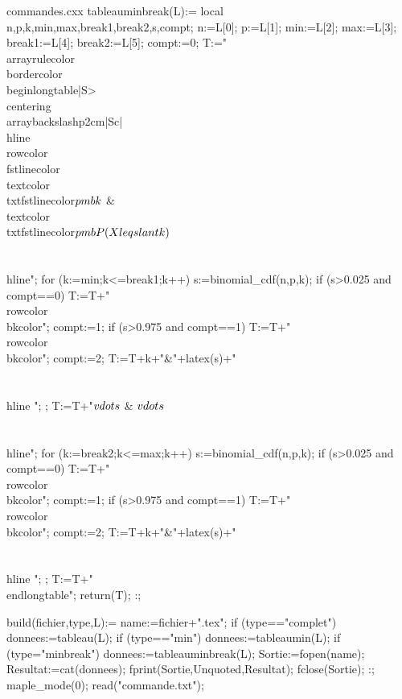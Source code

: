 \begin{VerbatimOut}{commandes.cxx}
tableauminbreak(L):={
 local n,p,k,min,max,break1,break2,s,compt;
 n:=L[0];
 p:=L[1];
 min:=L[2];
 max:=L[3];
 break1:=L[4];
 break2:=L[5];
 compt:=0;
 T:="\\arrayrulecolor{\\bordercolor}\\begin{longtable}{|S{>{\\centering\\arraybackslash}p{2cm}}|Sc|} \\hline\\rowcolor{\\fstlinecolor}\\textcolor{\\txtfstlinecolor}{$\\pmb{k}$} & \\textcolor{\\txtfstlinecolor}{$\\pmb{P(X\\leqslant k)}$} \\\\ \\hline";
 for (k:=min;k<=break1;k++)
 {
         s:=binomial_cdf(n,p,k);
         if (s>0.025 and compt==0) { T:=T+"\\rowcolor{\\bkcolor}"; compt:=1;}
         if (s>0.975 and compt==1) { T:=T+"\\rowcolor{\\bkcolor}"; compt:=2;}                T:=T+k+"&"+latex(s)+"\\\\ \\hline ";
 };
 T:=T+"$\\vdots$ & $\\vdots$\\\\ \\hline";
 for (k:=break2;k<=max;k++)
 {
         s:=binomial_cdf(n,p,k);
         if (s>0.025 and compt==0) { T:=T+"\\rowcolor{\\bkcolor}"; compt:=1;}
         if (s>0.975 and compt==1) { T:=T+"\\rowcolor{\\bkcolor}"; compt:=2;}                T:=T+k+"&"+latex(s)+"\\\\ \\hline ";
 };
 T:=T+"\\end{longtable}";
 return(T);
}:;

build(fichier,type,L):={
 name:=fichier+".tex";
 if (type=="complet")
 {
 	donnees:=tableau(L);
 }
 if (type=="min")
 {
 	donnees:=tableaumin(L);
 }
 if (type="minbreak")
 {
 	donnees:=tableauminbreak(L);
 }
 Sortie:=fopen(name);
 Resultat:=cat(donnees);
 fprint(Sortie,Unquoted,Resultat);
 fclose(Sortie);
}:;
maple_mode(0);
read("commande.txt");
\end{VerbatimOut}

\newenvironment{echantillon}
{\VerbatimEnvironment\begin{VerbatimOut}{commande.txt}}
{\end{VerbatimOut}
\immediate\write18{giac < commandes.cxx}
\immediate\write18{giac  commandes.cxx}
}